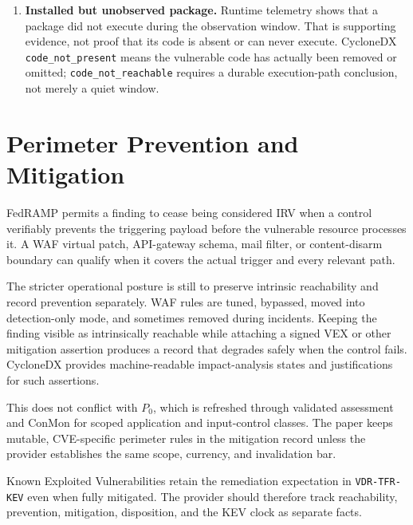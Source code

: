 \documentclass[11pt]{article}
\newcommand{\code}[1]{\texttt{#1}}
\begin{document}
\begin{enumerate}[leftmargin=1.8em]
\item \textbf{Installed but unobserved package.}
Runtime telemetry shows that a package did not execute during the observation
window. That is supporting evidence, not proof that its code is absent or can
never execute. CycloneDX \code{code\_not\_present} means the vulnerable code
has actually been removed or omitted; \code{code\_not\_reachable} requires a
durable execution-path conclusion, not merely a quiet window.\cite{cyclonedx}
\end{enumerate}

\section{Perimeter Prevention and Mitigation}
\label{sec:waf}
FedRAMP permits a finding to cease being considered IRV when a control
verifiably prevents the triggering payload before the vulnerable resource
processes it.\cite{fedramp-ver} A WAF virtual patch, API-gateway schema, mail
filter, or content-disarm boundary can qualify when it covers the actual
trigger and every relevant path.

The stricter operational posture is still to preserve intrinsic reachability
and record prevention separately. WAF rules are tuned, bypassed, moved into
detection-only mode, and sometimes removed during incidents. Keeping the
finding visible as intrinsically reachable while attaching a signed VEX or
other mitigation assertion produces a record that degrades safely when the
control fails. CycloneDX provides machine-readable impact-analysis states and
justifications for such assertions.\cite{cyclonedx}

This does not conflict with $P_0$, which is refreshed through validated
assessment and ConMon for scoped application and input-control classes. The
paper keeps mutable, CVE-specific perimeter rules in the mitigation record
unless the provider establishes the same scope, currency, and invalidation bar.

Known Exploited Vulnerabilities retain the remediation expectation in
\code{VDR-TFR-KEV} even when fully mitigated.\cite{fedramp-vdr} The provider
should therefore track reachability, prevention, mitigation, disposition, and
the KEV clock as separate facts.
\end{document}
